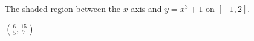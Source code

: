 {The shaded region between the $x$-axis and $y=x^3+1$ on $[-1,2]$.\\

\noindent\begin{minipage}{\linewidth}
\centering
{}
\end{minipage}
}
{$\left( \frac{6}{5}, \frac{15}{7} \right)$
}
